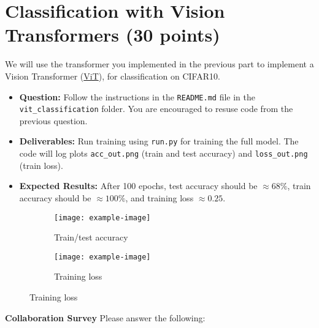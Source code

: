 \documentclass[11pt,addpoints,answers]{exam}
\numberwithin{equation}{section} %
\numberwithin{figure}{section} %
\numberwithin{table}{section} %
\begin{document}
\section{Classification with Vision Transformers (30 points)}



We will use the transformer you implemented in the previous part to implement a Vision Transformer (\href{https://arxiv.org/abs/2010.11929}{ViT}), for classification on CIFAR10. 

\begin{itemize}
    \item \textbf{Question:} Follow the instructions in the \texttt{README.md} file in the \texttt{vit\_classification} folder. You are encouraged to resuse code from the previous question. 
    \item \textbf{Deliverables:} Run training using \texttt{run.py} for training the full model. The code will log plots \texttt{acc\_out.png} (train and test accuracy) and \texttt{loss\_out.png} (train loss). 
    \item \textbf{Expected Results:} After 100 epochs, test accuracy should be $\approx 68\%$, train accuracy should be $\approx 100\%$, and training loss $\approx 0.25$. 
\end{itemize}

\begin{figure}[H]
    \centering
    \begin{subfigure}[b]{0.32\linewidth}
        \texttt{[image: example-image]}
        \caption{Train/test accuracy}
    \end{subfigure}
    \begin{subfigure}[b]{0.32\linewidth}
        \texttt{[image: example-image]}
        \caption{Training loss}
    \end{subfigure}
\end{figure}

\clearpage

\textbf{Collaboration Survey} Please answer the following:
\end{document}
